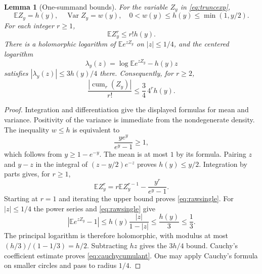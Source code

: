 \documentclass[11pt,a4paper]{article}
\numberwithin{equation}{section}
\newtheorem{lemma}[theorem]{Lemma}
\theoremstyle{definition}\newtheorem{definition}[theorem]{Definition}
\theoremstyle{remark}\newtheorem{remark}[theorem]{Remark}
\newcommand{\E}{\mathbb E}
\newcommand{\Var}{\operatorname{Var}}
\begin{document}
\begin{lemma}[One-summand bounds]\label{lem:single}
For the variable $Z_y$ in \eqref{eq:truncexp},
\[
 \E Z_y=h(y),\quad \Var Z_y=w(y),\quad
 0<w(y)\le h(y)\le \min(1,y/2).
\]
For each integer $r\ge1$,
\begin{equation}\label{eq:rawsingle}
 \E Z_y^r\le r!h(y).
\end{equation}
There is a holomorphic logarithm of $\E e^{zZ_y}$ on $|z|\le1/4$, and the centered logarithm
\[
 \lambda_y(z)=\log\E e^{zZ_y}-h(y)z
\]
satisfies $|\lambda_y(z)|\le3h(y)/4$ there. Consequently, for $r\ge2$,
\begin{equation}\label{eq:cauchycumulant}
 \frac{|\operatorname{cum}_r(Z_y)|}{r!}
 \le \frac34\,4^rh(y).
\end{equation}
\end{lemma}
\begin{proof}
Integration and differentiation give the displayed formulas for mean and variance. Positivity of the variance is immediate from the nondegenerate density. The inequality $w\le h$ is equivalent to
\[
 \frac{ye^y}{e^y-1}\ge1,
\]
which follows from $y\ge1-e^{-y}$. The mean is at most $1$ by its formula. Pairing $z$ and $y-z$ in the integral of $(z-y/2)e^{-z}$ proves $h(y)\le y/2$.
Integration by parts gives, for $r\ge1$,
\[
 \E Z_y^r=r\E Z_y^{r-1}-\frac{y^r}{e^y-1}.
\]
Starting at $r=1$ and iterating the upper bound proves \eqref{eq:rawsingle}.
For $|z|\le1/4$ the power series and \eqref{eq:rawsingle} give
\[
 |\E e^{zZ_y}-1|\le h(y)\frac{|z|}{1-|z|}\le\frac{h(y)}3\le\frac13.
\]
The principal logarithm is therefore holomorphic, with modulus at most
$(h/3)/(1-1/3)=h/2$. Subtracting $hz$ gives the $3h/4$ bound. Cauchy's coefficient estimate proves \eqref{eq:cauchycumulant}. One may apply Cauchy's formula on smaller circles and pass to radius $1/4$.
\end{proof}
\end{document}
